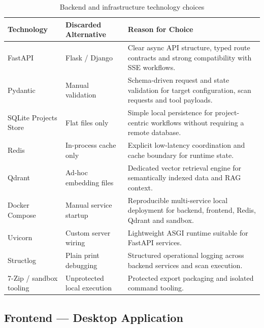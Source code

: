 \documentclass[12pt,a4paper]{report}
\begin{document}
\begin{table}[H]
    \centering
    \renewcommand{\arraystretch}{1.35}
    \begin{tabular}{|p{}|p{}|p{}|}
        \hline
        \textbf{Technology} & \textbf{Discarded Alternative} & \textbf{Reason for
        Choice} \\
        \hline
        FastAPI & Flask / Django & Clear async API structure, typed route contracts
        and strong compatibility with SSE workflows. \\
        \hline
        Pydantic & Manual validation & Schema-driven request and state validation
        for target configuration, scan requests and tool payloads. \\
        \hline
        SQLite Projects Store & Flat files only & Simple local persistence for
        project-centric workflows without requiring a remote database. \\
        \hline
        Redis & In-process cache only & Explicit low-latency coordination and cache
        boundary for runtime state. \\
        \hline
        Qdrant & Ad-hoc embedding files & Dedicated vector retrieval engine for
        semantically indexed data and RAG context. \\
        \hline
        Docker Compose & Manual service startup & Reproducible multi-service local
        deployment for backend, frontend, Redis, Qdrant and sandbox. \\
        \hline
        Uvicorn & Custom server wiring & Lightweight ASGI runtime suitable for
        FastAPI services. \\
        \hline
        Structlog & Plain print debugging & Structured operational logging across
        backend services and scan execution. \\
        \hline
        7-Zip / sandbox tooling & Unprotected local execution & Protected export
        packaging and isolated command tooling. \\
        \hline
    \end{tabular}
    \caption{Backend and infrastructure technology choices}
    \label{tab:backend_stack}
\end{table}

\subsection{Frontend --- Desktop Application}
\end{document}

